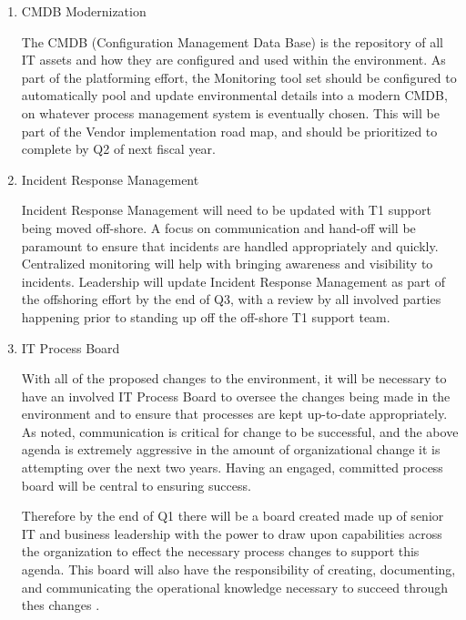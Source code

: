 \documentclass[stu]{apa7}
\begin{document}
\begin{enumerate}
\item CMDB Modernization
\label{sec:orgd3637a0}

The CMDB (Configuration Management Data Base) is the repository of all IT assets and how they are configured and used within the environment. As part of the platforming effort, the Monitoring tool set should be configured to automatically pool and update environmental details into a modern CMDB, on whatever process management system is eventually chosen. This will be part of the Vendor implementation road map, and should be prioritized to complete by Q2 of next fiscal year.

\item Incident Response Management
\label{sec:org40472ee}

Incident Response Management will need to be updated with T1 support being moved off-shore. A focus on communication and hand-off will be paramount to ensure that incidents are handled appropriately and quickly. Centralized monitoring will help with bringing awareness and visibility to incidents. Leadership will update Incident Response Management as part of the offshoring effort by the end of Q3, with a review by all involved parties happening prior to standing up off the off-shore T1 support team.

\item IT Process Board
\label{sec:org9b4010b}

With all of the proposed changes to the environment, it will be necessary to have an involved IT Process Board to oversee the changes being made in the environment and to ensure that processes are kept up-to-date appropriately. As \citet{kotterLeadingChange2012} noted, communication is critical for change to be successful, and the above agenda is extremely aggressive in the amount of organizational change it is attempting over the next two years. Having an engaged, committed process board will be central to ensuring success.

Therefore by the end of Q1 there will be a board created made up of senior IT and business leadership with the power to draw upon capabilities across the organization to effect the necessary process changes to support this agenda. This board will also have the responsibility of creating, documenting, and communicating the operational knowledge necessary to succeed through thes changes \citep{yangEnablingEffectiveOperational2017}.
\end{enumerate}
\end{document}

